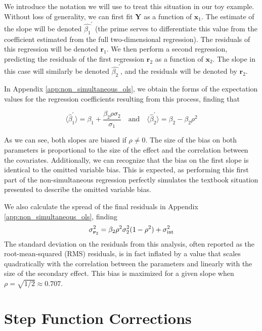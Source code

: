 We introduce the notation we will use to treat this situation in our toy example. Without loss of generality, we can first fit $\bm{Y}$ as a function of $\bm{x}_1$. The estimate of the slope will be denoted $\hat{\beta_1}^\prime$ (the prime serves to differentiate this value from the coefficient estimated from the full two-dimensional regression). The residuals of this regression will be denoted $\bm{r}_1$. We then perform a second regression, predicting the residuals of the first regression $\bm{r}_2$ as a function of $\bm{x}_2$. The slope in this case will similarly be denoted $\hat{\beta_2}^\prime$, and the residuals will be denoted by $\bm{r}_2$.

In Appendix \ref{app:non_simultaneous_ols}, we obtain the forms of the expectation values for the regression coefficients resulting from this process, finding that

\begin{equation*}
    \langle\hat{\beta}_1^\prime\rangle = \beta_1 + \frac{\beta_2\rho\sigma_2}{\sigma_1}\quad\text{and}\quad\langle\hat{\beta}_2^\prime\rangle = \beta_2 - \beta_2\rho^2
\end{equation*}

As we can see, both slopes are biased if $\rho \neq 0$. The size of the bias on both parameters is proportional to the size of the effect and the correlation between the covariates. Additionally, we can recognize that the bias on the first slope is identical to the omitted variable bias. This is expected, as performing this first part of the non-simultaneous regression perfectly simulates the textbook situation presented to describe the omitted variable bias.

We also calculate the spread of the final residuals in Appendix \ref{app:non_simultaneous_ols}, finding
\begin{equation}
    \sigma_{\bm{r}_2}^2 = \beta_2\rho^2\sigma_2^2(1-\rho^2) + \sigma_{\text{int}}^2
\end{equation}
The standard deviation on the residuals from this analysis, often reported as the root-mean-squared (RMS) residuals, is in fact inflated by a value that scales quadratically with the correlation between the parameters and linearly with the size of the secondary effect. This bias is maximized for a given slope when $\rho = \sqrt{1/2} \approx 0.707$.
\section{Step Function Corrections}
\label{sec:add_step}

